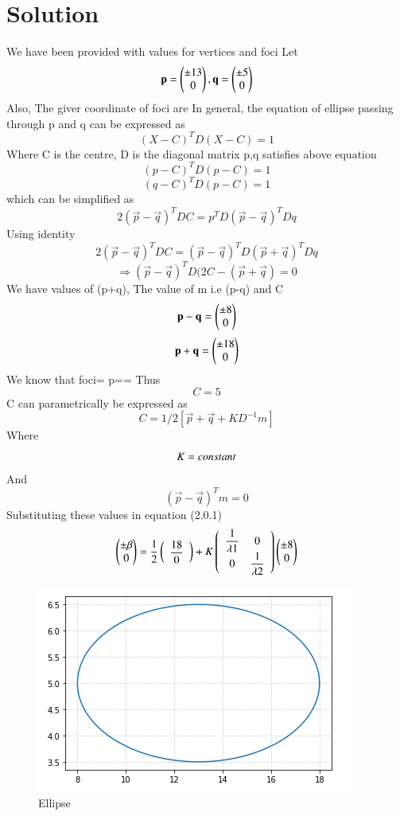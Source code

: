 \documentclass[journal,12pt,twocolumn]{IEEEtran}
\begin{document}
\section{Solution}
We have been provided with values for vertices and foci
\newline
Let
$$\mathbf {p}=\begin{pmatrix}\pm 13\\0\end{pmatrix},
\mathbf {q}=\begin{pmatrix}\pm 5\\0\end{pmatrix}$$
Also, The giver coordinate of foci are 
In general, the equation of ellipse passing through p and q can be expressed as 
$$(X-C)^TD (X-C)=1$$
Where
\newline
C is the centre, D is the diagonal matrix 
p,q satisfies above equation
$$(p-C)^T D (p-C)=1$$
$$(q-C)^T D (p-C)=1$$
which can be simplified as 
$$2(\vec{p}-\vec{q})^T DC= p^T D(\vec{p}-\vec{q})^T Dq$$
Using identity
$$2(\vec{p}-\vec{q})^T DC= (\vec{p}-\vec{q})^TD(\vec{p}+\vec{q})^TDq$$
$$\Rightarrow (\vec{p}-\vec{q})^T D (2C-(\vec{p}+\vec{q}) = 0$$
We have values of (p+q), The value of m i.e (p-q) and C
$$\mathbf {p-q}=\begin{pmatrix}\pm 8\\0\end{pmatrix}$$
$$\mathbf {p+q}=\begin{pmatrix}\pm 18\\0\end{pmatrix}$$
We know that foci= p==
Thus $$C=5$$
C can parametrically be expressed as
\begin{equation}
C=1/2 [\vec{p}+\vec{q}+KD^{-1}m]
\end{equation}
Where
$$\newline K= constant$$
And $$(\vec{p}-\vec{q})^Tm=0$$
Substituting these values in equation (2.0.1)
$$\begin{pmatrix}\pm \beta\\0\end{pmatrix}=\dfrac{1}{2}\left(\begin{array}{cc}\dfrac{18}{0}\end{array}\right)+K \left(\begin{array}{cc} \dfrac{1}{\lambda1} & 0\\ 0 & \dfrac{1}{\lambda2}\end{array}\right)\begin{pmatrix}\pm 8\\0\end{pmatrix}$$
\begin{figure}[ht]
    \centering
    \includegraphics[width=\columnwidth]{ellipse.png}
    \caption{Ellipse}
    \label{Ellipse along given axis}
\end{figure}
\end{document}
